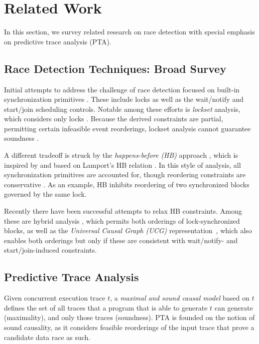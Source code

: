 \section{Related Work}

In this section, we survey related research on race detection with special emphasis on predictive trace analysis (PTA).

\subsection{Race Detection Techniques: Broad Survey} 

Initial attempts to address the challenge of race detection focused on built-in synchronization primitives \cite{eraserPaper,Agarwal,vonPraun:2001,Choi:2002}. These include locks as well as the wait/notify and start/join scheduling controls. Notable among these efforts is \emph{lockset} analysis, which considers only locks \cite{eraserPaper}. Because the derived constraints are partial, permitting certain infeasible event reorderings, lockset analysis cannot guarantee soundness \cite{Naik:2006}. 

A different tradeoff is struck by the \emph{happens-before (HB)} approach \cite{Christiaens:2001,Dinning:1990,Mellor-Crummey:1991}, which is inspired by and based on Lamport's HB relation \cite{Lamport}. In this style of analysis, all synchronization primitives are accounted for, though reordering constraints are conservative . As an example, HB inhibits reordering of two synchronized blocks governed by the same lock. 


Recently there have been successful attempts to relax HB constraints. Among these are hybrid analysis \cite{XXX}, which permits both orderings of lock-synchronized blocks, as well as the \emph{Universal Causal Graph (UCG)} representation~\cite{ucg}, which also enables both orderings but only if these are consistent with wait/notify- and start/join-induced constraints.

\subsection{Predictive Trace Analysis}

Given concurrent execution trace $t$, a \emph{maximal and sound causal model} based on $t$ defines the set of all traces that a program that is able to generate $t$ can generate (maximality), and only those traces (soundness). PTA is founded on the notion of sound causality, as it considers feasible reorderings of the input trace that prove a candidate data race as such. 

